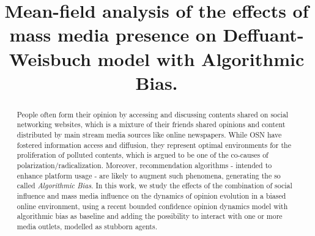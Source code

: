 \documentclass[10pt,letterpaper]{article}
\begin{document}
%
\title{Mean-field analysis of the effects of mass media presence on Deffuant-Weisbuch model with Algorithmic Bias.}
%
%


%
%
\maketitle              %
%
\begin{abstract}
People often form their opinion by accessing and discussing contents shared on social networking websites, which is a mixture of their friends shared opinions and content distributed by main stream media sources like online newspapers.
While OSN have fostered information access and diffusion, they represent optimal environments for the proliferation of polluted contents, which is argued to be one of the co-causes of polarization/radicalization. 
Moreover, recommendation algorithms - intended to enhance platform usage - are likely to augment such phenomena, generating the so called \emph{Algorithmic Bias}. In this work, we study the effects of the combination of social influence and mass media influence on the dynamics of opinion evolution in a biased online environment, using a recent bounded confidence opinion dynamics model with algorithmic bias as baseline and adding the possibility to interact with one or more media outlets, modelled as stubborn agents.
\end{abstract}
%
%
%
\end{document}
